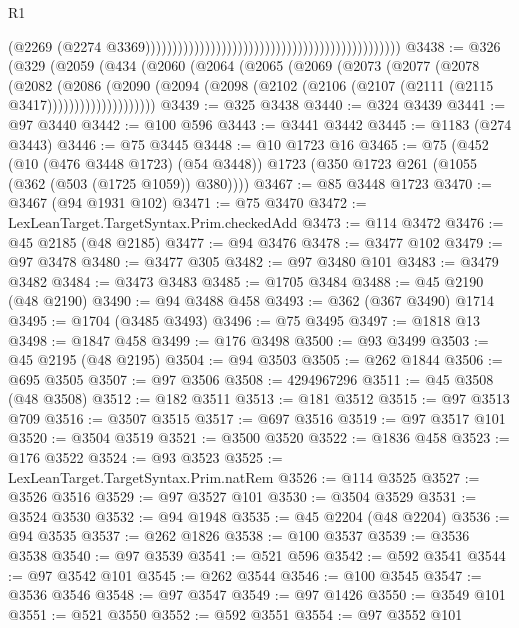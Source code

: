 \begin{lexlean}{R1}
\begin{coremodule}
                                                                                              (@2269
                                                                                                (@2274
                                                                                                  @3369)))))))))))))))))))))))))))))))))))))))))))))))
@3438 := @326
    (@329
      (@2059
        (@434
          (@2060
            (@2064
              (@2065
                (@2069
                  (@2073
                    (@2077
                      (@2078
                        (@2082
                          (@2086
                            (@2090
                              (@2094
                                (@2098 (@2102 (@2106 (@2107 (@2111 (@2115 @3417))))))))))))))))))))
@3439 := @325 @3438
@3440 := @324 @3439
@3441 := @97 @3440
@3442 := @100 @596
@3443 := @3441 @3442
@3445 := @1183 (@274 @3443)
@3446 := @75 @3445
@3448 := @10 @1723 @16
@3465 := @75
    (@452
      (@10 (@476 @3448 @1723) (@54 @3448))
      @1723
      (@350 @1723 @261 (@1055 (@362 (@503 (@1725 @1059)) @380))))
@3467 := @85 @3448 @1723
@3470 := @3467 (@94 @1931 @102)
@3471 := @75 @3470
@3472 := LexLeanTarget.TargetSyntax.Prim.checkedAdd
@3473 := @114 @3472
@3476 := @45 @2185 (@48 @2185)
@3477 := @94 @3476
@3478 := @3477 @102
@3479 := @97 @3478
@3480 := @3477 @305
@3482 := @97 @3480 @101
@3483 := @3479 @3482
@3484 := @3473 @3483
@3485 := @1705 @3484
@3488 := @45 @2190 (@48 @2190)
@3490 := @94 @3488 @458
@3493 := @362 (@367 @3490) @1714
@3495 := @1704 (@3485 @3493)
@3496 := @75 @3495
@3497 := @1818 @13
@3498 := @1847 @458
@3499 := @176 @3498
@3500 := @93 @3499
@3503 := @45 @2195 (@48 @2195)
@3504 := @94 @3503
@3505 := @262 @1844
@3506 := @695 @3505
@3507 := @97 @3506
@3508 := 4294967296
@3511 := @45 @3508 (@48 @3508)
@3512 := @182 @3511
@3513 := @181 @3512
@3515 := @97 @3513 @709
@3516 := @3507 @3515
@3517 := @697 @3516
@3519 := @97 @3517 @101
@3520 := @3504 @3519
@3521 := @3500 @3520
@3522 := @1836 @458
@3523 := @176 @3522
@3524 := @93 @3523
@3525 := LexLeanTarget.TargetSyntax.Prim.natRem
@3526 := @114 @3525
@3527 := @3526 @3516
@3529 := @97 @3527 @101
@3530 := @3504 @3529
@3531 := @3524 @3530
@3532 := @94 @1948
@3535 := @45 @2204 (@48 @2204)
@3536 := @94 @3535
@3537 := @262 @1826
@3538 := @100 @3537
@3539 := @3536 @3538
@3540 := @97 @3539
@3541 := @521 @596
@3542 := @592 @3541
@3544 := @97 @3542 @101
@3545 := @262 @3544
@3546 := @100 @3545
@3547 := @3536 @3546
@3548 := @97 @3547
@3549 := @97 @1426
@3550 := @3549 @101
@3551 := @521 @3550
@3552 := @592 @3551
@3554 := @97 @3552 @101

\end{coremodule}
\end{lexlean}
